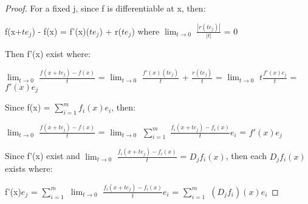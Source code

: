     \begin{proof}
        For a fixed j, since f is differentiable at x, then:

        \hspace{0.5cm}
        f(x+$te_j$) - f(x) = f'(x)($te_j$) + r($te_j$)
        \hspace{1cm}
        where $\lim_{t \rightarrow 0}$ $\frac{|r(te_j)|}{|t|}$ = 0

        Then f'(x) exist where:

        \hspace{0.5cm}
        $\lim_{t \rightarrow 0}$ $\frac{f(x+te_j) - f(x)}{t}$
        = $\lim_{t \rightarrow 0}$ $\frac{f'(x)(te_j)}{t}$ + $\frac{r(te_j)}{t}$
        = $\lim_{t \rightarrow 0}$ $t\frac{f'(x)e_j}{t}$
        = $f'(x)e_j$

        Since f(x) = $\sum_{i=1}^m f_i(x)e_i$, then:

        \hspace{0.5cm}
        $\lim_{t \rightarrow 0}$ $\frac{f(x+te_j) - f(x)}{t}$
        = $\lim_{t \rightarrow 0}$
            $\sum_{i=1}^m$ $\frac{f_i(x+te_j) - f_i(x)}{t}e_i$
        = $f'(x)e_j$

        Since f'(x) exist and
        $\lim_{t \rightarrow 0}$ $\frac{f_i(x+te_j) - f_i(x)}{t}$ = $D_jf_i(x)$,
        then each $D_jf_i(x)$ exists where:
        
        \hspace{0.5cm}
        f'(x)$e_j$
        = $\sum_{i=1}^m$ $\lim_{t \rightarrow 0}$
            $\frac{f_i(x+te_j) - f_i(x)}{t}e_i$
        = $\sum_{i=1}^m$ $(D_jf_i)(x)e_i$
    \end{proof}

    \vspace{0.5cm}



